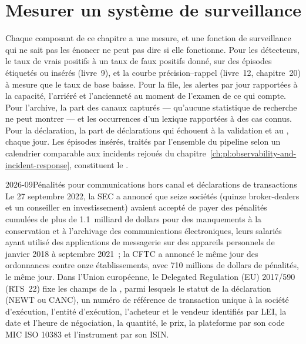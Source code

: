 \section{Mesurer un système de surveillance}

Chaque composant de ce chapitre a une mesure, et une fonction de surveillance qui ne sait pas les énoncer ne peut pas dire si elle fonctionne. Pour les détecteurs,
le taux de vrais positifs à un taux de faux positifs donné, sur des épisodes étiquetés ou insérés (livre~9), et la courbe précision--rappel (livre~12,
chapitre~20) à mesure que le taux de base baisse. Pour la file, les alertes par jour rapportées à la capacité, l'arriéré et l'ancienneté au moment de l'examen de ce qui compte. Pour
l'archive, la part des canaux capturés --- qu'aucune statistique de recherche ne peut montrer --- et les occurrences d'un lexique rapportées à des cas connus. Pour
la déclaration, la part de déclarations qui échouent à la validation et au , chaque jour. Les épisodes insérés, traités par l'ensemble du pipeline selon un calendrier comparable
aux incidents rejoués du chapitre~\ref{ch:pl:observability-and-incident-response}, constituent le .

\begin{dated}{2026-09}{Pénalités pour communications hors canal et déclarations de transactions}\label{dat:pl:surveillance-and-compliance-technology:rules}
Le 27 septembre 2022, la SEC a annoncé que seize sociétés (quinze broker-dealers et un conseiller en investissement) avaient accepté de payer des
pénalités cumulées de plus de 1.1~milliard de dollars pour des manquements à la conservation et à l'archivage des communications électroniques, leurs salariés ayant utilisé des
applications de messagerie sur des appareils personnels de janvier 2018 à septembre 2021~; la CFTC a annoncé le même jour des ordonnances contre onze établissements, avec
710 millions de dollars de pénalités, le même jour. Dans l'Union européenne, le Delegated Regulation (EU) 2017/590 (RTS~22) fixe les champs de la ,
parmi lesquels le statut de la déclaration (NEWT ou CANC), un numéro de référence de transaction unique à la société d'exécution, l'entité d'exécution, l'acheteur
et le vendeur identifiés par LEI, la date et l'heure de négociation, la quantité, le prix, la plateforme par son code MIC ISO 10383 et l'instrument par son ISIN.
\end{dated}

